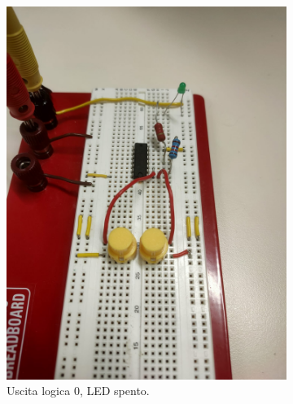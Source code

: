 \documentclass[a4paper,12pt]{article}
\begin{document}
\begin{figure}[H]
    \centering
    \begin{subfigure}[b]{0.47\textwidth}
        \centering
        \includegraphics[width=\linewidth]{immagini/latch/off.png}
        \caption{Uscita logica 0, LED spento.}
    \end{subfigure}
    \hfill
    \begin{subfigure}[b]{0.47\textwidth}
        \centering

\end{subfigure}
\end{figure}
\end{document}
